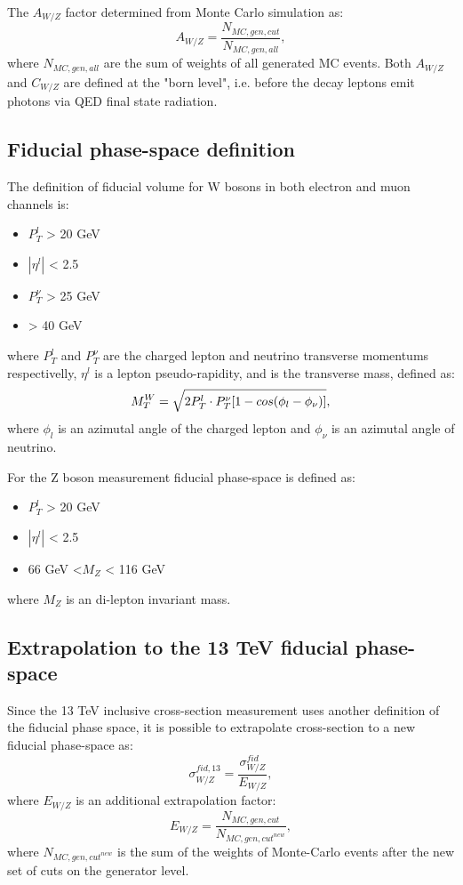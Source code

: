 The $A_{W/Z}$ factor determined from Monte Carlo simulation as: 
\begin{equation}
A_{W/Z}=\frac{N_{MC,gen, cut}}{N_{MC,gen,all}},
\end{equation}
where $N_{MC,gen,all}$ are the sum of weights of all generated MC events. Both $A_{W/Z}$ and $C_{W/Z}$ are defined at the "born level", i.e. before the decay leptons emit photons via QED final state radiation.

\subsection{Fiducial phase-space definition}
The definition of fiducial volume for W bosons in both electron and muon channels is:
\begin{itemize}
\item $P_T^l$ > 20 GeV
\item $|\eta^l|$ < 2.5 
\item $P_T^{\nu}$ > 25 GeV
\item \mtw > 40 GeV
\end{itemize}
where $P_T^l$ and $P_T^{\nu}$ are the charged lepton and neutrino transverse momentums respectivelly, $\eta^l $ is a lepton pseudo-rapidity, and \mtw is the transverse mass, defined as:
\begin{equation}\label{Eq:mtW}
M_T^W = \sqrt{ 2 P_T^l \cdot P_T^{\nu} [ 1 - cos (\phi_l - \phi_{\nu})]},
\end{equation}
where $\phi_l$ is an azimutal angle of the charged lepton and $\phi_{\nu}$ is an azimutal angle of neutrino.

For the Z boson measurement fiducial phase-space is defined as:
\begin{itemize}
\item $P_T^l$ > 20 GeV
\item $|\eta^l|$ < 2.5 
\item 66 GeV <$M_{Z}$ < 116 GeV
\end{itemize}
where $M_{Z}$ is an di-lepton invariant mass.

\subsection{Extrapolation to the 13 TeV fiducial phase-space}

Since the  13 TeV inclusive cross-section measurement  uses another definition of the fiducial phase space, it is possible to extrapolate cross-section to a new fiducial phase-space as:
\begin{equation}
\sigma^{fid,13}_{W/Z} = \frac{\sigma^{fid}_{W/Z}}{E_{W/Z}},
\end{equation}
where $E_{W/Z}$ is an additional extrapolation factor:
\begin{equation}
E_{W/Z}=\frac{N_{MC,gen, cut}}{N_{MC,gen, cut^{new}}},
\end{equation}
where $N_{MC,gen, cut^{new}}$ is the sum of the weights of Monte-Carlo events after the new set of cuts on the generator level.

